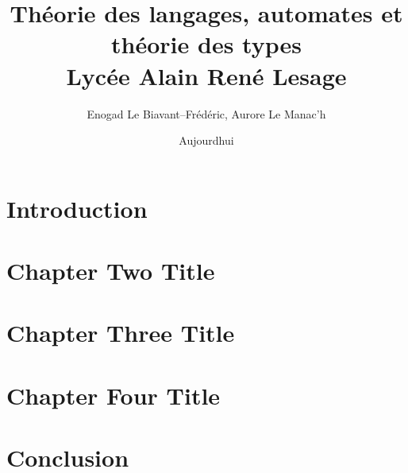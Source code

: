 \documentclass{report}
\title{
		{Théorie des langages, automates et théorie des types}\\
		{\large Lycée Alain René Lesage}\\
}
\author{Enogad Le Biavant--Frédéric, Aurore Le Manac'h}
\date{Aujourdhui}
\begin{document}
\maketitle
\tableofcontents
\chapter{Introduction}
%

\chapter{Chapter Two Title}
%

\chapter{Chapter Three Title}
%

\chapter{Chapter Four Title}
%

\chapter{Conclusion}
%
\end{document}
